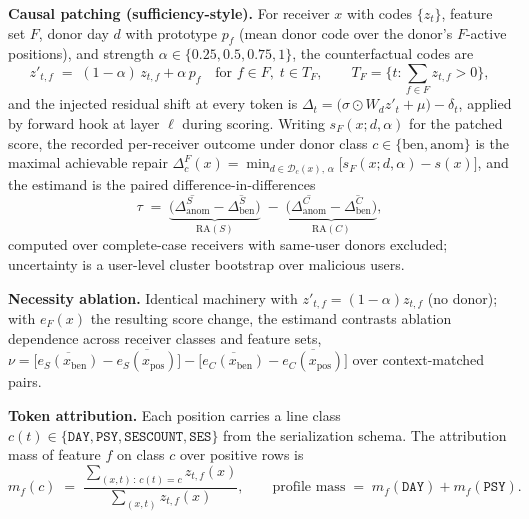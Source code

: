 \documentclass[10pt]{article} %
\begin{document}
\textbf{Causal patching (sufficiency-style).}
For receiver $x$ with codes $\{z_t\}$, feature set $F$, donor day $d$ with
prototype $p_f$ (mean donor code over the donor's $F$-active positions), and
strength $\alpha \in \{0.25, 0.5, 0.75, 1\}$, the counterfactual codes are
\begin{equation}
z'_{t,f} \;=\; (1-\alpha)\, z_{t,f} + \alpha\, p_f
\quad \text{for } f \in F,\; t \in T_F, \qquad
T_F = \{t : \textstyle\sum_{f \in F} z_{t,f} > 0\},
\end{equation}
and the injected residual shift at every token is
$\Delta_t = \bigl(\sigma \odot W_d z'_t + \mu\bigr) - \delta_t$, applied by
forward hook at layer $\ell$ during scoring. Writing $s_F(x; d, \alpha)$ for
the patched score, the recorded per-receiver outcome under donor class
$c \in \{\mathrm{ben}, \mathrm{anom}\}$ is the maximal achievable repair
$\Delta^{F}_{c}(x) = \min_{d \in \mathcal{D}_c(x),\, \alpha}
\bigl[s_F(x; d, \alpha) - s(x)\bigr]$, and the estimand is the paired
difference-in-differences
\begin{equation}
\tau \;=\; \underbrace{\bigl(\overline{\Delta^{S}_{\mathrm{anom}}} -
\overline{\Delta^{S}_{\mathrm{ben}}}\bigr)}_{\mathrm{RA}(S)} \;-\;
\underbrace{\bigl(\overline{\Delta^{C}_{\mathrm{anom}}} -
\overline{\Delta^{C}_{\mathrm{ben}}}\bigr)}_{\mathrm{RA}(C)},
\end{equation}
computed over complete-case receivers with same-user donors excluded;
uncertainty is a user-level cluster bootstrap over malicious users.

\textbf{Necessity ablation.}
Identical machinery with $z'_{t,f} = (1-\alpha) z_{t,f}$ (no donor); with
$e_F(x)$ the resulting score change, the estimand contrasts ablation
dependence across receiver classes and feature sets,
$\nu = \bigl[\overline{e_S(x_{\mathrm{ben}})} -
\overline{e_S(x_{\mathrm{pos}})}\bigr] -
\bigl[\overline{e_C(x_{\mathrm{ben}})} -
\overline{e_C(x_{\mathrm{pos}})}\bigr]$ over context-matched pairs.

\textbf{Token attribution.}
Each position carries a line class $c(t) \in \{\texttt{DAY}, \texttt{PSY},
\texttt{SESCOUNT}, \texttt{SES}\}$ from the serialization schema. The
attribution mass of feature $f$ on class $c$ over positive rows is
\begin{equation}
m_f(c) \;=\;
\frac{\sum_{(x,t)\,:\,c(t)=c} z_{t,f}(x)}{\sum_{(x,t)} z_{t,f}(x)},
\qquad \text{profile mass} \;=\; m_f(\texttt{DAY}) + m_f(\texttt{PSY}).
\end{equation}
\end{document}

